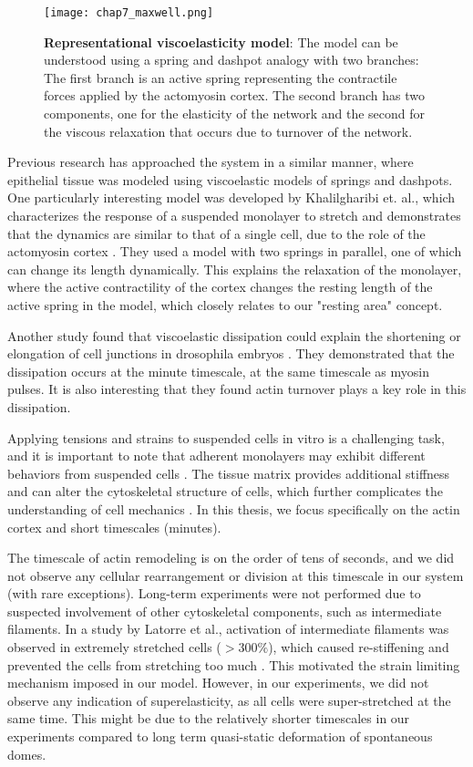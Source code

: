 \begin{figure}
	\centering
	\texttt{[image: chap7\_maxwell.png]}
	\caption{\label{fig_7_9} \textbf{Representational viscoelasticity model}: The model can be understood using a spring and dashpot analogy with two branches: The first branch is an active spring representing the contractile forces applied by the actomyosin cortex. The second branch has two components, one for the elasticity of the network and the second for the viscous relaxation that occurs due to turnover of the network.
	}
\end{figure}

Previous research has approached the system in a similar manner, where epithelial tissue was modeled using viscoelastic models of springs and dashpots. One particularly interesting model was developed by Khalilgharibi et. al., which characterizes the response of a suspended monolayer to stretch and demonstrates that the dynamics are similar to that of a single cell, due to the role of the actomyosin cortex \cite{khalilgharibi2019}. They used a model with two springs in parallel, one of which can change its length dynamically. This explains the relaxation of the monolayer, where the active contractility of the cortex changes the resting length of the active spring in the model, which closely relates to our "resting area" concept.

Another study found that viscoelastic dissipation could explain the shortening or elongation of cell junctions in drosophila embryos \cite{clement2017}. They demonstrated that the dissipation occurs at the minute timescale, at the same timescale as myosin pulses. It is also interesting that they found actin turnover plays a key role in this dissipation.

Applying tensions and strains to suspended cells in vitro is a challenging task, and it is important to note that adherent monolayers may exhibit different behaviors from suspended cells \cite{harris2012}. The tissue matrix provides additional stiffness and can alter the cytoskeletal structure of cells, which further complicates the understanding of cell mechanics \cite{humphrey2014, kechagia2019}. In this thesis, we focus specifically on the actin cortex and short timescales (minutes).

The timescale of actin remodeling is on the order of tens of seconds, and we did not observe any cellular rearrangement or division at this timescale in our system (with rare exceptions). Long-term experiments were not performed due to suspected involvement of other cytoskeletal components, such as intermediate filaments. In a study by Latorre et al., activation of intermediate filaments was observed in extremely stretched cells ($>300\%$), which caused re-stiffening and prevented the cells from stretching too much \cite{latorre2018}. This motivated the strain limiting mechanism imposed in our model. However, in our experiments, we did not observe any indication of superelasticity, as all cells were super-stretched at the same time. This might be due to the relatively shorter timescales in our experiments compared to long term quasi-static deformation of spontaneous domes.

